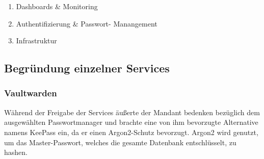 \begin{enumerate}
    \item Dashboards \& Monitoring
    \begin{itemize}
    \end{itemize}
    \item Authentifizierung \& Passwort- Manangement
    \begin{itemize}
    \end{itemize}
    \item Infrastruktur
    \begin{itemize}
    \end{itemize}
\end{enumerate}

\subsection{Begründung einzelner Services}

\subsubsection{Vaultwarden}

Während der Freigabe der Services äußerte der Mandant bedenken bezüglich dem ausgewählten Passwortmanager und brachte eine von ihm bevorzugte Alternative namens KeePass ein, da er einen Argon2-Schutz bevorzugt. Argon2 wird genutzt, um das Master-Passwort, welches die gesamte Datenbank entschlüsselt, zu hashen.   

